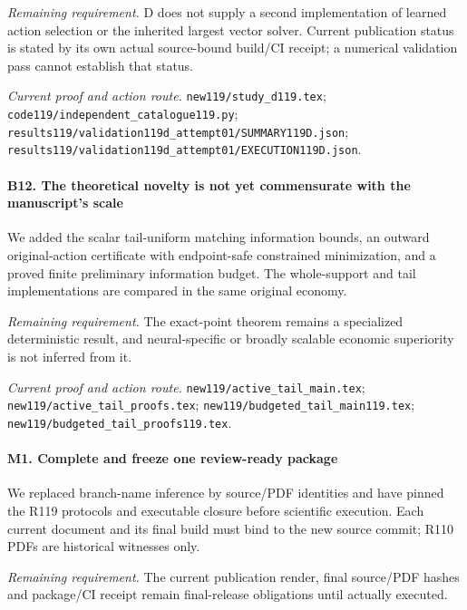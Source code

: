 \par\emph{Remaining requirement.} D does not supply a second implementation of learned action selection or the inherited largest vector solver. Current publication status is stated by its own actual source-bound build/\allowbreak{}CI receipt; a numerical validation pass cannot establish that status.

\par\emph{Current proof and action route.} \nolinkurl{new119/study_d119.tex}; \nolinkurl{code119/independent_catalogue119.py}; \nolinkurl{results119/validation119d_attempt01/SUMMARY119D.json}; \nolinkurl{results119/validation119d_attempt01/EXECUTION119D.json}.

\paragraph{B12. The theoretical novelty is not yet commensurate with the manuscript's scale}

We added the scalar tail-uniform matching information bounds, an outward original-action certificate with endpoint-safe constrained minimization, and a proved finite preliminary information budget. The whole-support and tail implementations are compared in the same original economy.

\par\emph{Remaining requirement.} The exact-point theorem remains a specialized deterministic result, and neural-specific or broadly scalable economic superiority is not inferred from it.

\par\emph{Current proof and action route.} \nolinkurl{new119/active_tail_main.tex}; \nolinkurl{new119/active_tail_proofs.tex}; \nolinkurl{new119/budgeted_tail_main119.tex}; \nolinkurl{new119/budgeted_tail_proofs119.tex}.

\paragraph{M1. Complete and freeze one review-ready package}

We replaced branch-name inference by source/\allowbreak{}PDF identities and have pinned the R119 protocols and executable closure before scientific execution. Each current document and its final build must bind to the new source commit; R110 PDFs are historical witnesses only.

\par\emph{Remaining requirement.} The current publication render, final source/\allowbreak{}PDF hashes and package/\allowbreak{}CI receipt remain final-release obligations until actually executed.

